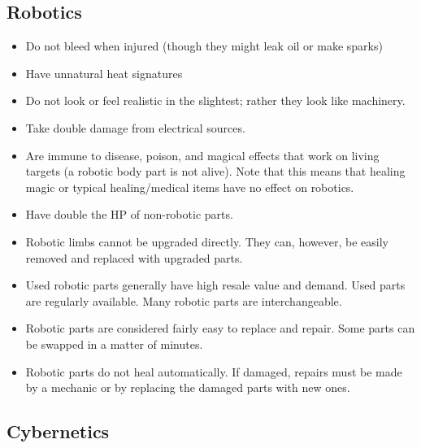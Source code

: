 \documentclass[twoside]{book}
\begin{document}
\subsection{Robotics}
    
\begin{itemize}
      
  \item   Do not bleed when injured (though they might leak
                 oil or make sparks) 
  \item   Have unnatural heat signatures 
  \item   Do not look or feel realistic in the slightest;
                 rather they look like machinery. 
  \item   Take double damage from electrical sources.
                 
  \item   Are immune to disease, poison, and magical
                 effects that work on living targets (a robotic body part
                 is not alive). Note that this means that healing magic
                 or typical healing/medical items have no effect on
                 robotics. 
  \item   Have double the HP of non-robotic parts. 
  \item   Robotic limbs cannot be upgraded directly. They
                 can, however, be easily removed and replaced with
                 upgraded parts. 
  \item   Used robotic parts generally have high resale
                 value and demand. Used parts are regularly available.
                 Many robotic parts are interchangeable. 
  \item   Robotic parts are considered fairly easy to
                 replace and repair. Some parts can be swapped in a
                 matter of minutes. 
  \item   Robotic parts do not heal automatically. If
                 damaged, repairs must be made by a mechanic or by
                 replacing the damaged parts with new ones. 
\end{itemize}
  
    

\subsection{Cybernetics}
    
\end{document}
